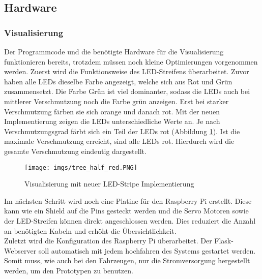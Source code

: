 \documentclass[.../Dokumentation.tex]{subfiles}
\begin{document}
    \subsection{Hardware}\label{sec-ita4-hardware}
        \subsubsection*{Visualisierung}
    Der Programmcode und die benötigte Hardware für die Visualisierung funktionieren bereits, trotzdem müssen noch kleine Optimierungen vorgenommen werden. Zuerst wird die Funktionsweise des LED-Streifens überarbeitet. Zuvor haben alle LEDs dieselbe Farbe angezeigt, welche sich aus Rot und Grün zusammensetzt. Die Farbe Grün ist viel dominanter, sodass die LEDs auch bei mittlerer Verschmutzung noch die Farbe grün anzeigen. Erst bei starker Verschmutzung färben sie sich orange und danach rot. Mit der neuen Implementierung zeigen die LEDs unterschiedliche Werte an. Je nach Verschmutzungsgrad färbt sich ein Teil der LEDs rot (Abbildung \ref{fig-hardware-tree-half-ref}). Ist die maximale Verschmutzung erreicht, sind alle LEDs rot. Hierdurch wird die gesamte Verschmutzung eindeutig dargestellt.
    \begin{figure}[H]
    	\begin{center}
    		\texttt{[image: imgs/tree\_half\_red.PNG]}
    		\caption{Visualisierung mit neuer LED-Stripe Implementierung}
    		\label{fig-hardware-tree-half-ref}
    	\end{center}
    \end{figure}
	\noindent
    Im nächsten Schritt wird noch eine Platine für den Raspberry Pi erstellt. Diese kann wie ein Shield auf die Pins gesteckt werden und die Servo Motoren sowie der LED-Streifen können direkt angeschlossen werden. Dies reduziert die Anzahl an benötigten Kabeln und erhöht die Übersichtlichkeit.\\
    Zuletzt wird die Konfiguration des Raspberry Pi überarbeitet. Der Flask-Webserver soll automatisch mit jedem hochfahren des Systems gestartet werden. Somit muss, wie auch bei den Fahrzeugen, nur die Stromversorgung hergestellt werden, um den Prototypen zu benutzen.
        
\end{document}
